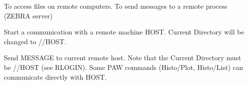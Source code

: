 \BEGTEXT
To access files on remote computers.
To send messages to a remote process (ZEBRA server)
\ENDTEXT

\BEGARG
{}
\ENDARG
\BEGTEXT
Start a communication with a remote machine HOST.
Current Directory will be changed to //HOST.
\ENDTEXT

\BEGARG
{}
\ENDARG
\BEGTEXT
Send MESSAGE to current remote host.
Note that the Current Directory must be //HOST (see RLOGIN).
Some PAW commands (Histo/Plot, Histo/List) can communicate
directly with HOST.
\ENDTEXT

